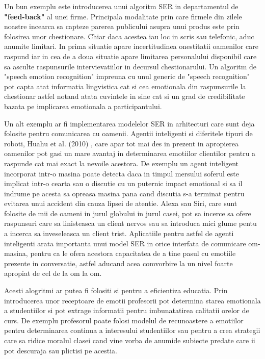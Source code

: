 \documentclass[a4paper,12pt, twoside]{book}
\begin{document}
					Un bun exemplu este introducerea unui algoritm SER in departamentul de \textbf{"feed-back"} al unei firme. Principala modalitate prin care firmele din zilele noastre incearca sa capteze parerea publicului asupra unui produs este prin folosirea unor chestionare. Chiar daca acestea iau loc in scris sau telefonic, aduc anumite limitari. In prima situatie apare incertitudinea onestitatii oamenilor care raspund iar in cea de a doua situatie apare limitarea personalului disponibil care sa asculte raspunsurile intervievatiilor in decursul chestionarului. Un algoritm de "speech emotion recognition" impreuna cu unul generic de "speech recognition" pot capta atat informatia lingvistica cat si cea emotionala din raspunsurile la chestionar astfel notand atata cuvintele in sine cat si un grad de credibilitate bazata pe implicarea emotionala a participantului. \par
		
					Un alt exemplu ar fi implementarea modelelor SER in arhitecturi care sunt deja folosite pentru comunicarea cu oamenii. Agentii inteligenti si diferitele tipuri de roboti, Huahu et al. (2010) \cite{huahu}, care apar tot mai des in prezent in apropierea oamenilor pot gasi un mare avantaj in determinarea emotiilor clientilor pentru a raspunde cat mai exact la nevoile acestora. De exemplu un agent inteligent incorporat intr-o masina poate detecta daca in timpul mersului soferul este implicat intr-o cearta sau o discutie cu un puternic impact emotional si sa il indrume pe acesta sa opreasa masina pana cand discutia s-a terminat pentru evitarea unui accident din cauza lipsei de atentie. Alexa sau Siri, care sunt folosite de mii de oameni in jurul globului in jurul casei, pot sa incerce sa ofere raspunsuri care sa linisteasca un client nervos sau sa introduca mici glume pentu a incerca sa inveseleasca un client trist. Aplicatiile pentru astfel de agenti inteligenti arata importanta unui model SER in orice interfata de comunicare om-masina, pentru ca le ofera acestora capacitatea de a tine pasul cu emotiile prezente in conversatie, astfel aducand acea comvorbire la un nivel foarte apropiat de cel de la om la om. \par 
						
					Acesti alogritmi ar putea fi folositi si pentru a eficientiza educatia. Prin introducerea unor receptoare de emotii profesorii pot determina starea emotionala a studentiilor si pot extrage informatii pentru imbunatatirea calitatii orelor de curs. De exemplu profesorul poate folosi modelul de recunoastere a emotiilor pentru determinarea continua a interesului studentiilor sau pentru a crea strategii care sa ridice moralul clasei cand vine vorba de anumide subiecte predate care ii pot descuraja sau plictisi pe acestia. \par
					
\end{document}
